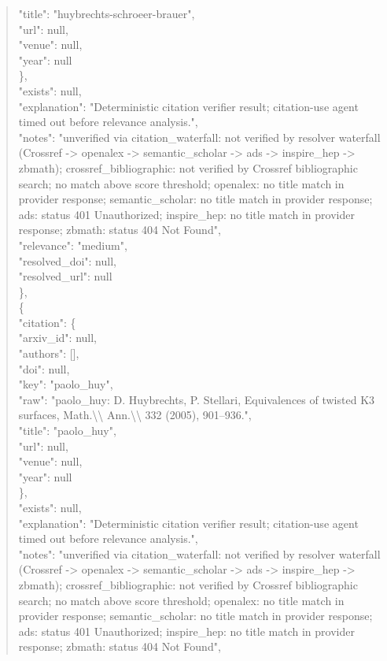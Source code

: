 \documentclass[11pt]{article}
\begin{document}
\begin{quote}
        "title": "huybrechts-schroeer-brauer",\\
        "url": null,\\
        "venue": null,\\
        "year": null\\
      \},\\
      "exists": null,\\
      "explanation": "Deterministic citation verifier result; citation-use agent timed out before relevance analysis.",\\
      "notes": "unverified via citation\_waterfall: not verified by resolver waterfall (Crossref -> openalex -> semantic\_scholar -> ads -> inspire\_hep -> zbmath); crossref\_bibliographic: not verified by Crossref bibliographic search; no match above score threshold; openalex: no title match in provider response; semantic\_scholar: no title match in provider response; ads: status 401 Unauthorized; inspire\_hep: no title match in provider response; zbmath: status 404 Not Found",\\
      "relevance": "medium",\\
      "resolved\_doi": null,\\
      "resolved\_url": null\\
    \},\\
    \{\\
      "citation": \{\\
        "arxiv\_id": null,\\
        "authors": [],\\
        "doi": null,\\
        "key": "paolo\_huy",\\
        "raw": "paolo\_huy: D. Huybrechts, P. Stellari, Equivalences of twisted K3 surfaces, Math.\textbackslash{}\textbackslash{} Ann.\textbackslash{}\textbackslash{} 332 (2005), 901--936.",\\
        "title": "paolo\_huy",\\
        "url": null,\\
        "venue": null,\\
        "year": null\\
      \},\\
      "exists": null,\\
      "explanation": "Deterministic citation verifier result; citation-use agent timed out before relevance analysis.",\\
      "notes": "unverified via citation\_waterfall: not verified by resolver waterfall (Crossref -> openalex -> semantic\_scholar -> ads -> inspire\_hep -> zbmath); crossref\_bibliographic: not verified by Crossref bibliographic search; no match above score threshold; openalex: no title match in provider response; semantic\_scholar: no title match in provider response; ads: status 401 Unauthorized; inspire\_hep: no title match in provider response; zbmath: status 404 Not Found",\\

\end{quote}
\end{document}
